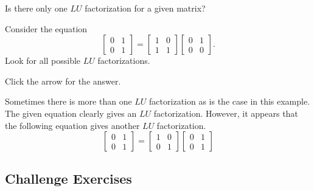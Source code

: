\documentclass{ximera}
\begin{document}
\begin{problem}\label{prb:4.74} Is there only one $LU$ factorization for a given matrix? 
\begin{hint}
Consider the equation
\begin{equation*}
\left[
\begin{array}{rr}
0 & 1 \\
0 & 1
\end{array}
\right] =\left[
\begin{array}{rr}
1 & 0 \\
1 & 1
\end{array}
\right] \left[
\begin{array}{rr}
0 & 1 \\
0 & 0
\end{array}
\right] .
\end{equation*}
Look for all possible $LU$ factorizations.

Click the arrow for the answer.
\begin{expandable}
Sometimes there is more than one $LU$ factorization as is the case in this
example. The given equation clearly gives an $LU$ factorization. However, it
appears that the following equation gives another $LU$ factorization.
\[
\left[
\begin{array}{cc}
0 & 1 \\
0 & 1
\end{array}
\right] =\left[
\begin{array}{cc}
1 & 0 \\
0 & 1
\end{array}
\right] \left[
\begin{array}{cc}
0 & 1 \\
0 & 1
\end{array}
\right]
\]
\end{expandable}
\end{hint}
\end{problem}

\subsection*{Challenge Exercises}
\end{document}

